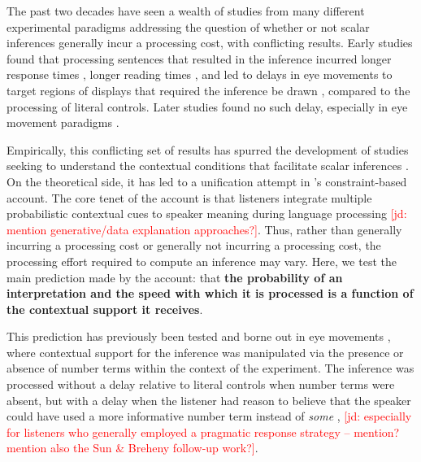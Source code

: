 \documentclass[10pt,letterpaper]{article}
\newcommand{\jd}[1]{\textcolor{Red}{[jd: #1]}}
\begin{document}
The past two decades have seen a wealth of studies from many different experimental paradigms addressing the question of whether or not scalar inferences generally incur a processing cost, with conflicting results. Early studies found that processing sentences that resulted in the inference incurred longer response times \cite{BottNoveck2004, TomlinsonEtAl2012,DegenTanenhaus2015}, longer reading times \cite{BrehenyEtAl2006}, and led to delays in eye movements to target regions of displays that required the inference be drawn \cite{HuangSnedeker2009,HuangSnedeker2011,DegenTanenhaus2016}, compared to the processing of literal controls. Later studies found no such delay, especially in eye movement paradigms \cite{Grodner2010,Breheny2013,DegenTanenhaus2016,SunBreheny2019}. 

Empirically, this conflicting set of results has spurred the development of studies seeking to understand the contextual conditions that facilitate scalar inferences \cite{Zondervan2010,Degen2015,Augurzky2019,MartyChemla2013,DegenGoodman2014,SunBreheny2019}. On the theoretical side, it has led to a unification attempt in 's constraint-based account. The core tenet of the account is that listeners integrate multiple probabilistic contextual cues to speaker meaning during language processing \jd{mention generative/data explanation approaches?}. Thus, rather than generally incurring a processing cost or generally not incurring a processing cost, the processing effort required to compute an inference may vary. Here, we test the main prediction made by the account: that \textbf{the probability of an interpretation and the speed with which it is processed is a function of the contextual support it receives}. 

This prediction has previously been tested and borne out in eye movements \cite{DegenTanenhaus2016}, where contextual support for the inference was manipulated via the presence or absence of number terms within the context of the experiment. The inference was processed without a delay relative to literal controls when number terms were absent, but with a delay when the listener had reason to believe that the speaker could have used a more informative number term instead of \emph{some} \cite{DegenTanenhaus2016}, \jd{especially for listeners who generally employed a pragmatic response strategy -- mention? mention also the Sun \& Breheny follow-up work?}.
\end{document}
